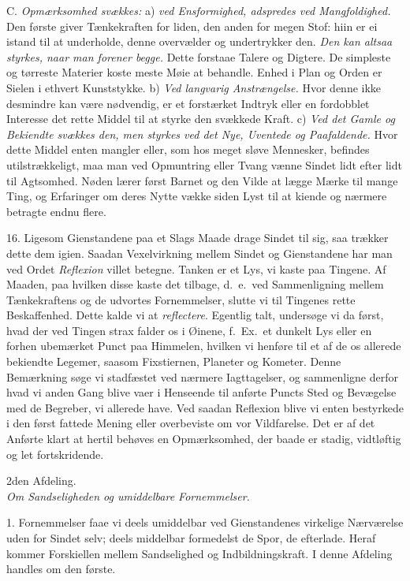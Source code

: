 \documentclass[12pt,a4paper]{article}
\newcommand{\afdeling}[2]{%
  \medskip\begin{center}{\large #1}\\[4pt]{\emph{#2}}\end{center}\smallskip}
\newcommand{\opage}[1]{\marginnote{\footnotesize\textit{[#1]}}}
\begin{document}
C. \emph{Opmærksomhed svækkes:} a) \emph{ved Ensformighed, adspredes ved
Mangfoldighed.} Den første giver Tænkekraften for liden, den anden for megen Stof:
hiin er ei istand til at underholde, denne overvælder og undertrykker den. \emph{Den
kan altsaa styrkes, naar man forener begge.} Dette forstaae Talere og Digtere. De
simpleste og tørreste Materier koste meste Møie at behandle. Enhed i Plan og Orden er
Sielen i ethvert Kunststykke. b) \emph{Ved langvarig Anstrængelse.} Hvor denne ikke
desmindre kan være nødvendig, er et forstærket
\opage{59} Indtryk eller en fordobblet Interesse det rette Middel til at styrke den svækkede
Kraft. c) \emph{Ved det Gamle og Bekiendte svækkes den, men styrkes ved det Nye,
Uventede og Paafaldende.} Hvor dette Middel enten mangler eller, som hos meget sløve
Mennesker, befindes utilstrækkeligt, maa man ved Opmuntring eller Tvang vænne Sindet
lidt efter lidt til Agtsomhed. Nøden lærer først Barnet og den Vilde at lægge Mærke
til mange Ting, og Erfaringer om deres Nytte vække siden Lyst til at kiende og nærmere
betragte endnu flere.

16. Ligesom Gienstandene paa et Slags Maade drage Sindet til sig, saa trækker dette
dem igien. Saadan Vexelvirkning mellem Sindet og Gienstandene har man ved Ordet
\emph{Reflexion} villet betegne. Tanken er et Lys, vi kaste paa Tingene. Af Maaden,
paa hvilken disse kaste det tilbage, d.~e.\ ved Sammenligning mellem Tænkekraftens og
de udvortes Fornemmelser, slutte vi til Tingenes rette Beskaffenhed. Dette kalde vi at
\emph{reflectere}. Egentlig talt, undersøge vi da først, hvad der ved Tingen strax
falder os i Øinene, f.~Ex.\ et dunkelt Lys eller en forhen ubemærket Punct paa
Himmelen, hvilken vi henføre til et af de os allerede bekiendte Legemer, saasom
Fixstiernen, Planeter og Kometer. Denne Bemærkning søge vi stadfæstet ved nærmere
Iagttagelser, og sammenligne derfor hvad vi anden Gang blive vaer i Henseende til
anførte Puncts
\opage{60} Sted og Bevægelse med de Begreber, vi allerede have. Ved saadan Reflexion blive vi
enten bestyrkede i den først fattede Mening eller overbeviste om vor Vildfarelse. Det
er af det Anførte klart at hertil behøves en Opmærksomhed, der baade er stadig,
vidtløftig og let fortskridende.

\afdeling{2den Afdeling.}{Om Sandseligheden og umiddelbare Fornemmelser.}

1. Fornemmelser faae vi deels umiddelbar ved Gienstandenes virkelige Nærværelse uden
for Sindet selv; deels middelbar formedelst de Spor, de efterlade. Heraf kommer
Forskiellen mellem Sandselighed og Indbildningskraft. I denne Afdeling handles om den
første.
\end{document}

